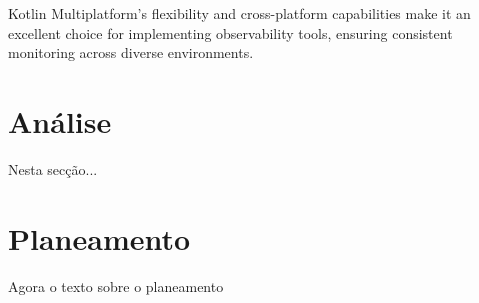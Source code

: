 \documentclass[a4paper,twoside,11pt]{article}
\begin{document}
Kotlin Multiplatform's flexibility and cross-platform capabilities make it an excellent choice for implementing observability tools, ensuring consistent monitoring across diverse environments.

\section{Análise}
Nesta secção...

\section{Planeamento}
Agora o texto sobre o planeamento



\end{document}
